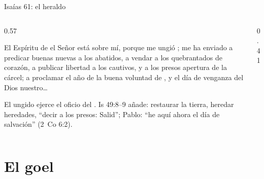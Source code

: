 \begin{frame}{Isaías 61: el heraldo}
\begin{columns}[c,onlytextwidth]
\begin{column}{0.57\textwidth}
\begin{cita}El Espíritu de \SENOR{} el Señor está sobre mí, porque me ungió \SENOR; me ha enviado a predicar buenas nuevas a los abatidos, a vendar a los quebrantados de corazón, a publicar libertad a los cautivos, y a los presos apertura de la cárcel; a proclamar el año de la buena voluntad de \SENOR, y el día de venganza del Dios nuestro\ldots{}\end{cita}
\scriptsize\RaggedRight El ungido ejerce el oficio del . Is 49:8--9 añade: restaurar la tierra, heredar heredades, ``decir a los presos: Salid''; Pablo: ``he aquí ahora el día de salvación'' (2~Co 6:2).
\end{column}
\begin{column}{0.41\textwidth}\end{column}
\end{columns}
\end{frame}



\section{El goel}

